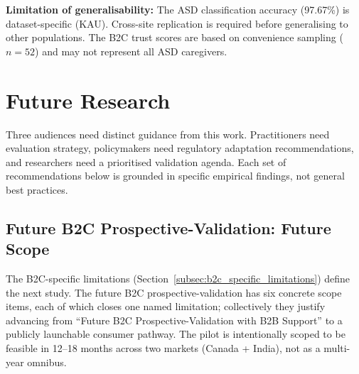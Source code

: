 \noindent\textbf{Limitation of generalisability:} The ASD classification accuracy (97.67\%) is dataset-specific (KAU). Cross-site replication is required before generalising to other populations. The B2C trust scores are based on convenience sampling ($n = 52$) and may not represent all ASD caregivers.

\section{Future Research}



Three audiences need distinct guidance from this work. Practitioners need evaluation strategy, policymakers need regulatory adaptation recommendations, and researchers need a prioritised validation agenda. Each set of recommendations below is grounded in specific empirical findings, not general best practices.

\subsection{Future B2C Prospective-Validation: Future Scope}
\label{subsec:b2c_pilot_future_scope}

The B2C-specific limitations (Section~\ref{subsec:b2c_specific_limitations}) define the next study. The future B2C prospective-validation has six concrete scope items, each of which closes one named limitation; collectively they justify advancing from ``Future B2C Prospective-Validation with B2B Support'' to a publicly launchable consumer pathway. The pilot is intentionally scoped to be feasible in 12--18 months across two markets (Canada + India), not as a multi-year omnibus.

